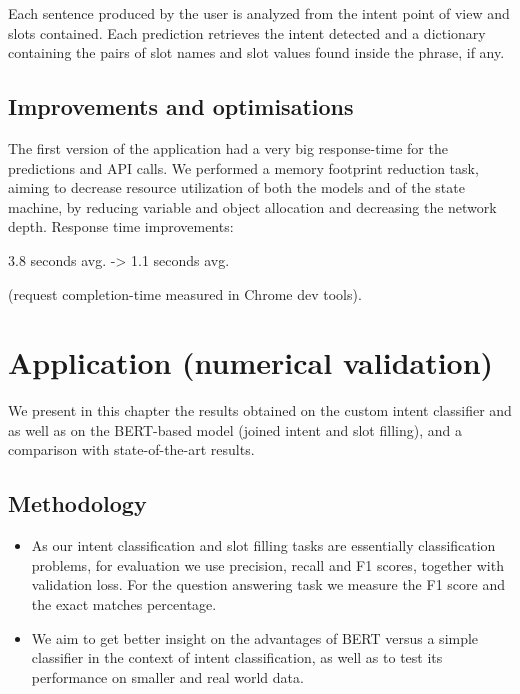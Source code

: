 \documentclass[runningheads,a4paper,11pt]{report}
\begin{document}
Each sentence produced by the user is analyzed from the intent point of view and slots contained. Each prediction retrieves the intent detected and a dictionary containing the pairs of slot names and slot values found inside the phrase, if any.

\section{Improvements and optimisations}
\label{section:optim}

The first version of the application had a very big response-time for the predictions and API calls. We performed a memory footprint reduction task, aiming to decrease resource utilization of both the models and of the state machine, by reducing variable and object allocation and decreasing the network depth. Response time improvements: 

        3.8 seconds avg. -> 1.1 seconds avg. 
        
        (request completion-time measured in Chrome dev tools).



\chapter{Application (numerical validation)}
\label{chapter:applicaion}

We present in this chapter the results obtained on the custom intent classifier and as well as on the BERT-based model (joined intent and slot filling), and a comparison with state-of-the-art results.

\section{Methodology}
\label{section:methodology}

\begin{itemize}
	\item As our intent classification and slot filling tasks are essentially classification problems, for evaluation we use precision, recall and F1 scores, together with validation loss. For the question answering task we measure the F1 score and the exact matches percentage.
	\item We aim to get better insight on the advantages of BERT versus a simple classifier in the context of intent classification, as well as to test its performance on smaller and real world data.
\end{itemize}
\end{document}
